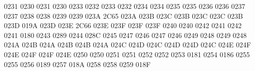  0231 0230 %
 0231 0230 %
 0233 0232 %
 0233 0232 %
 0234 0234 %
 0235 0235 %
 0236 0236 %
 0237 0237 %
 0238 0238 %
 0239 0239 %
\setcclcucx 023A 2C65 023A %
\setcclcucx 023B 023C 023B %
\setcclcucx 023C 023C 023B %
\setcclcucx 023D 019A 023D %
\setcclcucx 023E 2C66 023E %
\setcclcucx 023F 023F 023F %
 0240 0240 %
 0242 0241 %
 0242 0241 %
 0180 0243 %
 0289 0244 %
 028C 0245 %
 0247 0246 %
 0247 0246 %
 0249 0248 %
 0249 0248 %
\setcclcucx 024A 024B 024A %
\setcclcucx 024B 024B 024A %
\setcclcucx 024C 024D 024C %
\setcclcucx 024D 024D 024C %
\setcclcucx 024E 024F 024E %
\setcclcucx 024F 024F 024E %
 0250 0250 %
 0251 0251 %
 0252 0252 %
 0253 0181 %
 0254 0186 %
 0255 0255 %
 0256 0189 %
 0257 018A %
 0258 0258 %
 0259 018F %
